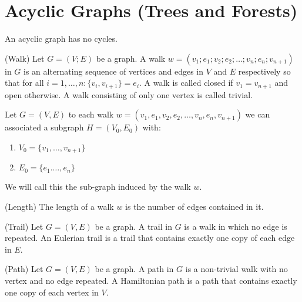 \section{Acyclic Graphs (Trees and Forests)}
An acyclic graph has no cycles.
%
\begin{definition}{(Walk)}
Let \(G = (V;E)\) be a graph.
A walk \(w = (v_1; e_1;\allowbreak v_2; e_2; \dots;\allowbreak v_n; e_n; v_{n+1})\) in \(G\) is an alternating sequence of vertices and edges in \(V\) and \(E\) respectively so that for all \(i = 1,\dots, n: \{v_i, v_{i+1}\} = e_i\).
A walk is called closed if \(v_1 = v_{n+1}\) and open otherwise.
A walk consisting of only one vertex is called trivial.
\end{definition}

\begin{remark}
Let \(G = (V,E)\) to each walk \(w = (v_1, e_1,\allowbreak v_2, e_2,\dots,\allowbreak v_n, e_n, v_{n+1})\) we can associated a subgraph \(H = (V_0,E_0)\) with:
\begin{enumerate}
\item  \(V_0 =\{ v_1,\dots,v_{n+1}\}\)
\item  \(E_0 =\{ e_1.\dots,e_n\}\)
\end{enumerate}
We will call this the sub-graph induced by the walk \(w\).
\end{remark}

\begin{definition}{(Length)}
The length of a walk \(w\) is the number of edges contained in it.
\end{definition}
%


\begin{definition}{(Trail)}
Let \(G = (V,E)\) be a graph.
A trail in \(G\) is a walk in which no edge is repeated.
An Eulerian trail is a trail that contains exactly one copy of each edge in \(E\).
\end{definition}

\begin{definition}{(Path)}
Let \(G = (V,E)\) be a graph.
A path in \(G\) is a non-trivial walk with no vertex and no edge repeated.
A Hamiltonian path is a path that contains exactly one copy of each vertex in \(V\).
\end{definition}




